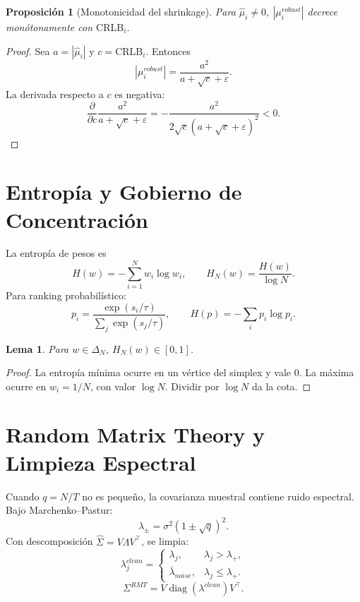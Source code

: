 \documentclass[11pt,letterpaper]{article}
\newtheorem{proposition}{Proposición}
\newtheorem{lemma}{Lema}
\DeclareMathOperator{\diag}{diag}
\newcommand{\1}{\mathbbm{1}}
\begin{document}
\begin{proposition}[Monotonicidad del shrinkage]
Para \(\hat{\mu}_i\ne0\), \(|\mu_i^{robust}|\) decrece monótonamente con \(\mathrm{CRLB}_i\).
\end{proposition}

\begin{proof}
Sea \(a=|\hat{\mu}_i|\) y \(c=\mathrm{CRLB}_i\). Entonces
\[
|\mu_i^{robust}|=\frac{a^2}{a+\sqrt{c}+\varepsilon}.
\]
La derivada respecto a \(c\) es negativa:
\[
\frac{\partial}{\partial c}
\frac{a^2}{a+\sqrt{c}+\varepsilon}
=
-\frac{a^2}{2\sqrt{c}(a+\sqrt{c}+\varepsilon)^2}<0.
\]
\end{proof}

\section{Entropía y Gobierno de Concentración}

La entropía de pesos es
\[
  H(w)=-\sum_{i=1}^N w_i\log w_i,
  \qquad
  H_N(w)=\frac{H(w)}{\log N}.
\]
Para ranking probabilístico:
\[
  p_i=\frac{\exp(s_i/\tau)}{\sum_j\exp(s_j/\tau)},
  \qquad
  H(p)=-\sum_i p_i\log p_i.
\]

\begin{lemma}
Para \(w\in\Delta_N\), \(H_N(w)\in[0,1]\).
\end{lemma}
\begin{proof}
La entropía mínima ocurre en un vértice del simplex y vale \(0\). La máxima ocurre en \(w_i=1/N\), con valor \(\log N\). Dividir por \(\log N\) da la cota.
\end{proof}

\section{Random Matrix Theory y Limpieza Espectral}

Cuando \(q=N/T\) no es pequeño, la covarianza muestral contiene ruido espectral. Bajo Marchenko--Pastur:
\[
  \lambda_{\pm}
  =
  \sigma^2(1\pm\sqrt{q})^2.
\]
Con descomposición \(\hat{\Sigma}=V\Lambda V^\top\), se limpia:
\[
  \lambda_j^{clean}
  =
  \begin{cases}
  \lambda_j, & \lambda_j>\lambda_+,\\
  \bar{\lambda}_{noise}, & \lambda_j\le\lambda_+.
  \end{cases}
\]
\[
  \Sigma^{RMT}=V\diag(\lambda^{clean})V^\top.
\]
\end{document}
